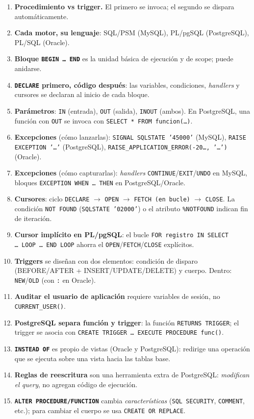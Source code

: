 \documentclass[11pt,a4paper]{article}
\begin{document}
\begin{enumerate}
    \item \textbf{Procedimiento vs trigger.} El primero se invoca; el
    segundo se dispara automáticamente.
    \item \textbf{Cada motor, su lenguaje}: SQL/PSM (MySQL), PL/pgSQL
    (PostgreSQL), PL/SQL (Oracle).
    \item \textbf{Bloque \texttt{BEGIN \dots\ END}} es la unidad básica
    de ejecución y de scope; puede anidarse.
    \item \textbf{\texttt{DECLARE} primero, código después}: las
    variables, condiciones, \emph{handlers} y cursores se declaran al
    inicio de cada bloque.
    \item \textbf{Parámetros}: \texttt{IN} (entrada), \texttt{OUT}
    (salida), \texttt{INOUT} (ambos). En PostgreSQL, una función con
    \texttt{OUT} se invoca con \texttt{SELECT * FROM funcion(\dots)}.
    \item \textbf{Excepciones} (cómo lanzarlas):
    \texttt{SIGNAL SQLSTATE '45000'} (MySQL), \texttt{RAISE EXCEPTION
    '\dots'} (PostgreSQL), \texttt{RAISE\_APPLICATION\_ERROR(-20\dots,
    '\dots')} (Oracle).
    \item \textbf{Excepciones} (cómo capturarlas): \emph{handlers}
    \texttt{CONTINUE}/\texttt{EXIT}/\texttt{UNDO} en MySQL, bloques
    \texttt{EXCEPTION WHEN \dots\ THEN} en PostgreSQL/Oracle.
    \item \textbf{Cursores}: ciclo \texttt{DECLARE} $\to$
    \texttt{OPEN} $\to$ \texttt{FETCH (en bucle)} $\to$
    \texttt{CLOSE}. La condición \texttt{NOT FOUND} (\texttt{SQLSTATE
    '02000'}) o el atributo \texttt{\%NOTFOUND} indican fin de
    iteración.
    \item \textbf{Cursor implícito en PL/pgSQL}: el bucle
    \texttt{FOR registro IN SELECT \dots\ LOOP \dots\ END LOOP}
    ahorra el \texttt{OPEN}/\texttt{FETCH}/\texttt{CLOSE} explícitos.
    \item \textbf{Triggers} se diseñan con dos elementos: condición
    de disparo (BEFORE/AFTER + INSERT/UPDATE/DELETE) y cuerpo.
    Dentro: \texttt{NEW}/\texttt{OLD} (con \texttt{:} en Oracle).
    \item \textbf{Auditar el usuario de aplicación} requiere
    variables de sesión, no \texttt{CURRENT\_USER()}.
    \item \textbf{PostgreSQL separa función y trigger}: la función
    \texttt{RETURNS TRIGGER}; el trigger se asocia con
    \texttt{CREATE TRIGGER \dots\ EXECUTE PROCEDURE func()}.
    \item \textbf{\texttt{INSTEAD OF}} es propio de vistas (Oracle y
    PostgreSQL): redirige una operación que se ejecuta sobre una
    vista hacia las tablas base.
    \item \textbf{Reglas de reescritura} son una herramienta extra de
    PostgreSQL: \emph{modifican el query}, no agregan código de
    ejecución.
    \item \textbf{\texttt{ALTER PROCEDURE/FUNCTION}} cambia
    \emph{características} (\texttt{SQL SECURITY}, \texttt{COMMENT},
    etc.); para cambiar el cuerpo se usa \texttt{CREATE OR REPLACE}.
\end{enumerate}
\end{document}
